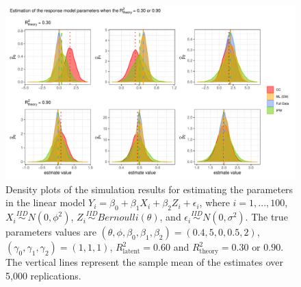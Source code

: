 \documentclass[
  12pt,
]{article}
\begin{document}
\begin{figure}

{\centering \includegraphics{sampldist-1} 

}

\caption{Density plots of the simulation results for estimating the parameters in the linear model $Y_i = \beta_0 + \beta_1 X_i + \beta_2 Z_i + \epsilon_i$, where $i = 1,...,100$, $X_i \overset{IID}{\sim} N(0, \phi^2)$, $Z_i \overset{IID}{\sim} Bernoulli(\theta)$, and $\epsilon_i \overset{IID}{\sim} N(0, \sigma^2)$. The true parameters values are $(\theta, \phi, \beta_0, \beta_1, \beta_2) = (0.4, 5, 0, 0.5, 2)$, $(\gamma_0, \gamma_1, \gamma_2) = (1, 1, 1)$, $R_{\mathrm{latent}}^2 = 0.60$ and $R_{\mathrm{theory}}^2 = 0.30 \text{ or } 0.90$. The vertical lines represent the sample mean of the estimates over 5,000 replications.}\label{fig:sampldist}
\end{figure}
\end{document}

